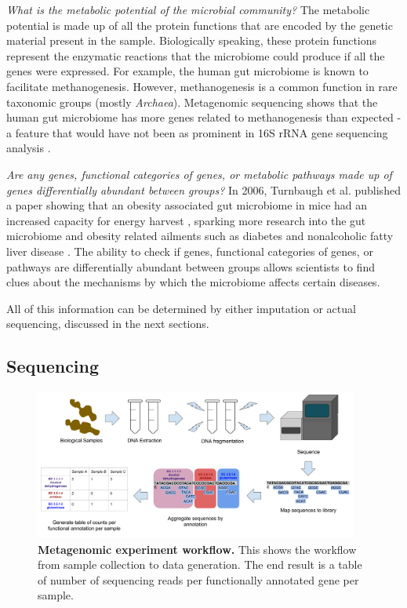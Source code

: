 \textit{What is the metabolic potential of the microbial community?}
The metabolic potential is made up of all the protein functions that are encoded by the genetic material present in the sample. Biologically speaking, these protein functions represent the enzymatic reactions that the microbiome could produce if all the genes were expressed. For example, the human gut microbiome is known to facilitate methanogenesis. However, methanogenesis is a common function in rare taxonomic groups (mostly \textit{Archaea}). Metagenomic sequencing shows that the human gut microbiome has more genes related to methanogenesis than expected - a feature that would have not been as prominent in 16S rRNA gene sequencing analysis \cite{gill2006metagenomic}.

\textit{Are any genes, functional categories of genes, or metabolic pathways made up of genes differentially abundant between groups?}
In 2006, Turnbaugh et al. published a paper showing that an obesity associated gut microbiome in mice had an increased capacity for energy harvest \cite{turnbaugh2006obesity}, sparking more research into the gut microbiome and obesity related ailments such as diabetes \cite{larsen2010gut} and nonalcoholic fatty liver disease \cite{zhu2013characterization}. The ability to check if genes, functional categories of genes, or pathways are differentially abundant between groups allows scientists to find clues about the mechanisms by which the microbiome affects certain diseases.

All of this information can be determined by either imputation or actual sequencing, discussed in the next sections.

\subsection{Sequencing}

\begin{figure}[h]
\begin{center}
\includegraphics[width=0.95\textwidth]{Metagenomic_pipeline.png}
\caption[Metagenomic experiment workflow.]{\textbf{Metagenomic experiment workflow.} This shows the workflow from sample collection to data generation. The end result is a table of number of sequencing reads per functionally annotated gene per sample.}
\label{metagenomic_workflow}
\end{center}
\end{figure}

